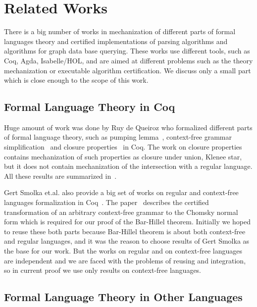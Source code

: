 \section{Related Works}
\label{sec:rel-work}

There is a big number of works in mechanization of different parts of formal languages theory and certified implementations of parsing algorithms and algorithms for graph data base querying.
These works use different tools, such as Coq, Agda, Isabelle/HOL, and are aimed at different problems such as the theory mechanization or executable algorithm certification.
We discuss only a small part which is close enough to the scope of this work.

\subsection{Formal Language Theory in Coq}

Huge amount of work was done by Ruy de Queiroz who formalized different parts of formal language theory, such as pumping lemma~\cite{ramos2015formalizationPumping}, context-free grammar simplification~\cite{ramos2015formalization} and closure properties~\cite{ramos2015formalizationClosure} in Coq.
The work on closure properties contains mechanization of such properties as closure under union, Klenee star, but it does not contain mechanization of the intersection with a regular language.
All these results are summarized in~\cite{ramos2016formalization}. 

Gert Smolka et.al. also provide a big set of works on regular and context-free languages formalization in Coq~\cite{smolka2017regular,smolka2013regular,kaiser2012constructive,smolkaHofmann2016}.
The paper~\cite{smolkaHofmann2016} describes the certified transformation of an arbitrary context-free grammar to the Chomsky normal form which is required for our proof of the Bar-Hillel theorem. 
Initially we hoped to reuse these both parts because Bar-Hillel theorem is about both context-free and regular languages, and it was the reason to choose results of Gert Smolka as the base for our work.
But the works on regular and on context-free languages are independent and we are faced with the problems of reusing and integration, so in current proof we use only results on context-free languages.

\subsection{Formal Language Theory in Other Languages}

